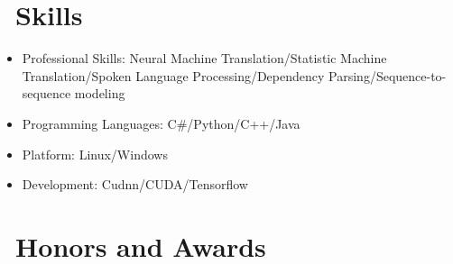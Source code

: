 \documentclass{resume}
\begin{document}

\section{\faCogs\ Skills}
\begin{itemize}[parsep=0.5ex]
  \item Professional Skills: Neural Machine Translation/Statistic Machine Translation/Spoken Language Processing/Dependency Parsing/Sequence-to-sequence modeling
  \item Programming Languages: C#/Python/C++/Java
  \item Platform: Linux/Windows
  \item Development: Cudnn/CUDA/Tensorflow
\end{itemize}

\section{\faHeartO\ Honors and Awards}

%
%
\end{document}
